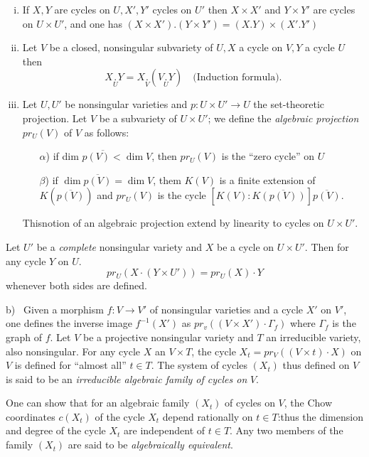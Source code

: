 {\begin{enumerate}[i)]
\item If $X,Y$ are cycles on $U,X',Y'$ cycles on $U'$ then  $X \times
  X'$ and $Y \times Y'$ are cycles on $U \times U'$, and one has $(X
  \times X')$.$(Y \times Y')=(X.Y)\times (X'.Y')$ 
  
\item Let $V$ be a closed, nonsingular subvariety of $U,X$ a cycle on
  $V,Y$ a cycle $U$ then  
  $$
  X \underset{U}.Y=X \underset{V}.(V \underset{U}.Y) \quad \text{(Induction
    formula)}. 
  $$

\item Let $U,U'$ be nonsingular varieties and $p: U \times U' \to U$ the
  set-theoretic projection. Let $V$ be a subvariety of $U \times U'$; we
  define  the \textit{algebraic projection} $pr_U(V) $ of $V$ as
  follows: 
  \begin{enumerate}
  \item[$\alpha$)] if dim $\overline{p(V)<} \dim V$, then $pr_U(V)$ is
    the ``zero cycle'' on $U$
  \item[$\beta$)]  if $\dim \overline{p(V)}=\dim V$, them $K(V)$ is a
    finite extension of\break $K(\overline{p(V)})$ and $pr_U(V)$ is the cycle $\left[ K(V):K
      \overline{(p(V))}\right]\overline{p(V)}$. 
  \end{enumerate}

  This\pageoriginale notion of an algebraic projection extend by linearity to cycles
  on $U \times U'$. 
\end{enumerate}

\begin{prop*}%
  Let $U'$ be a {\em complete} nonsingular variety and $X$ be a cycle
  on $U \times U'$. Then  for any cycle  $Y$ on $U$. 
  $$
  pr_U(X\cdot (Y \times U'))=pr_U(X)\cdot Y
  $$
  whenever both sides are defined. 
\end{prop*}

b)~ Given a morphism $f:V \to V'$ of nonsingular varieties and a cycle
$X'$ on $V'$, one defines the inverse image $f^{-1} (X')$ as $pr_v ((
V \times X')\cdot \Gamma_f)$ where $\Gamma_f$ is the graph of $f$.
 Let $V$ be a projective nonsingular variety and $T$ an irreducible
variety, also  nonsingular. For any cycle  $X$ an $V \times T$, the
cycle $X_t=pr_V((V \times t) \cdot X)$ on $V$ is defined for ``almost
all'' $t \in T$. The system of cycles $(X_t)$ thus defined on $V$ is
said to be an \textit{irreducible algebraic family of cycles on} $V$. 

One can show that for an algebraic family $(X_t)$ of cycles on $V$,
the Chow coordinates $c(X_t)$ of the cycle $X_t$ depend rationally on
$t\in T$:thus the dimension and degree of the cycle $X_t$ are
independent of $t \in T$. Any two members  of the family $(X_t)$ are
said to be \textit{algebraically equivalent}. 

}
